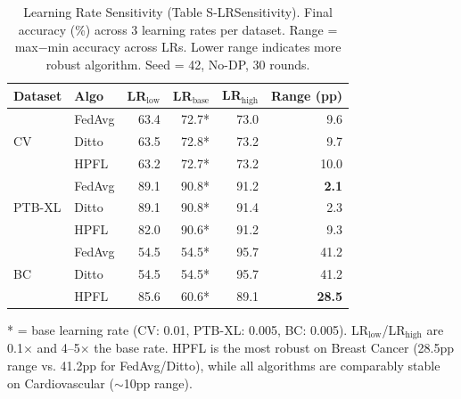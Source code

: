 \documentclass[conference,a4paper]{IEEEtran}
\begin{document}
\begin{table}[!ht]
\centering
\caption{Learning Rate Sensitivity (Table S-LRSensitivity). Final accuracy (\%) across 3 learning rates per dataset. Range = max$-$min accuracy across LRs. Lower range indicates more robust algorithm. Seed = 42, No-DP, 30 rounds.}
\label{tab:s_lr_sensitivity}
\scriptsize
\begin{tabular}{llrrrr}
\toprule
\textbf{Dataset} & \textbf{Algo} & \textbf{LR$_{\text{low}}$} & \textbf{LR$_{\text{base}}$} & \textbf{LR$_{\text{high}}$} & \textbf{Range (pp)} \\
\midrule
\multirow{3}{*}{CV} & FedAvg & 63.4 & 72.7* & 73.0 & 9.6 \\
 & Ditto & 63.5 & 72.8* & 73.2 & 9.7 \\
 & HPFL & 63.2 & 72.7* & 73.2 & 10.0 \\
\midrule
\multirow{3}{*}{PTB-XL} & FedAvg & 89.1 & 90.8* & 91.2 & \textbf{2.1} \\
 & Ditto & 89.1 & 90.8* & 91.4 & 2.3 \\
 & HPFL & 82.0 & 90.6* & 91.2 & 9.3 \\
\midrule
\multirow{3}{*}{BC} & FedAvg & 54.5 & 54.5* & 95.7 & 41.2 \\
 & Ditto & 54.5 & 54.5* & 95.7 & 41.2 \\
 & HPFL & 85.6 & 60.6* & 89.1 & \textbf{28.5} \\
\bottomrule
\end{tabular}

\vspace{1mm}
\footnotesize{* = base learning rate (CV: 0.01, PTB-XL: 0.005, BC: 0.005). LR$_{\text{low}}$/LR$_{\text{high}}$ are 0.1$\times$ and 4--5$\times$ the base rate. HPFL is the most robust on Breast Cancer (28.5pp range vs. 41.2pp for FedAvg/Ditto), while all algorithms are comparably stable on Cardiovascular ($\sim$10pp range).}
\end{table}
\end{document}
